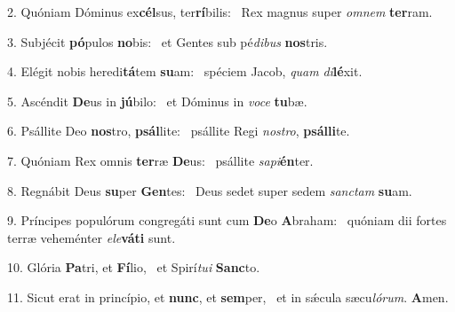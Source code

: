 2. Quóniam Dóminus ex\textbf{cél}sus, ter\textbf{rí}bilis: \ast\  Rex magnus super \textit{om}\textit{nem} \textbf{ter}ram.\

3. Subjécit \textbf{pó}pulos \textbf{no}bis: \ast\  et Gentes sub pé\textit{di}\textit{bus} \textbf{nos}tris.\

4. Elégit nobis heredi\textbf{tá}tem \textbf{su}am: \ast\  spéciem Jacob, \textit{quam} \textit{di}\textbf{lé}xit.\

5. Ascéndit \textbf{De}us in \textbf{jú}bilo: \ast\  et Dóminus in \textit{vo}\textit{ce} \textbf{tu}bæ.\

6. Psállite Deo \textbf{nos}tro, \textbf{psál}lite: \ast\  psállite Regi \textit{nos}\textit{tro}, \textbf{psál}\textbf{li}te.\

7. Quóniam Rex omnis \textbf{ter}ræ \textbf{De}us: \ast\  psállite \textit{sa}\textit{pi}\textbf{én}ter.\

8. Regnábit Deus \textbf{su}per \textbf{Gen}tes: \ast\  Deus sedet super sedem \textit{sanc}\textit{tam} \textbf{su}am.\

9. Príncipes populórum congregáti sunt cum \textbf{De}o \textbf{A}braham: \ast\  quóniam dii fortes terræ veheménter \textit{e}\textit{le}\textbf{vá}\textbf{ti} sunt.\

10. Glória \textbf{Pa}tri, et \textbf{Fí}lio, \ast\  et Spirí\textit{tu}\textit{i} \textbf{Sanc}to.\

11. Sicut erat in princípio, et \textbf{nunc}, et \textbf{sem}per, \ast\  et in sǽcula sæcu\textit{ló}\textit{rum}. \textbf{A}men.\

